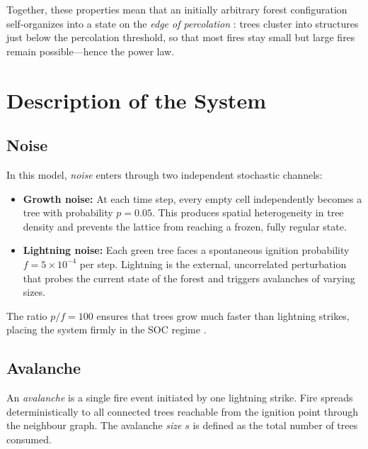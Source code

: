 \documentclass[12pt,a4paper]{article}
\begin{document}
Together, these properties mean that an initially arbitrary forest
configuration self-organizes into a state on the \emph{edge of
percolation} \cite{christensen2004}: trees cluster into structures just
below the percolation threshold, so that most fires stay small but
large fires remain possible---hence the power law.

\section{Description of the System}
\label{sec:description}

\subsection{Noise}

In this model, \emph{noise} enters through two independent stochastic
channels:

\begin{itemize}
  \item \textbf{Growth noise:}  At each time step, every empty cell
        independently becomes a tree with probability $p = 0.05$.
        This produces spatial heterogeneity in tree density and prevents
        the lattice from reaching a frozen, fully regular state.

  \item \textbf{Lightning noise:}  Each green tree faces a spontaneous
        ignition probability $f = 5\times10^{-4}$ per step.
        Lightning is the external, uncorrelated perturbation that
        probes the current state of the forest and triggers avalanches of
        varying sizes.
\end{itemize}

The ratio $p/f = 100$ ensures that trees grow much faster than lightning
strikes, placing the system firmly in the SOC regime \cite{drossel1992}.

\subsection{Avalanche}

An \emph{avalanche} is a single fire event initiated by one lightning
strike.  Fire spreads deterministically to all connected trees reachable
from the ignition point through the neighbour graph.  The avalanche
\emph{size} $s$ is defined as the total number of trees consumed.
\end{document}
